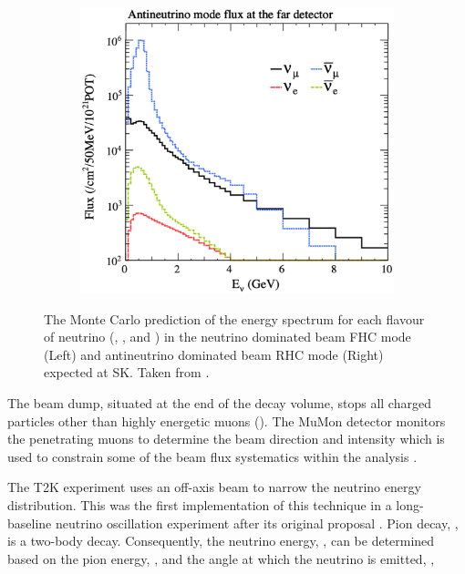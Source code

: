\begin{figure}[h]
\begin{subfigure}[t]{0.45\textwidth}
    \includegraphics[width=\textwidth, trim={0mm 0mm 0mm 0mm}, clip,page=1]{Figures/Detectors/T2KFluxInANuMode.pdf}
  \end{subfigure}
  \caption{The Monte Carlo prediction of the energy spectrum for each flavour of neutrino (, , \quickmath{\nu_\mu} and \quickmath{\bar{\nu}_\mu}) in the neutrino dominated beam FHC mode (Left) and antineutrino dominated beam RHC mode (Right) expected at SK. Taken from \cite{Abe2021-tr}.}
  \label{fig:T2KSKExp_T2K_NuFluxPerMode}
\end{figure}

The beam dump, situated at the end of the decay volume, stops all charged particles other than highly energetic muons (). The MuMon detector monitors the penetrating muons to determine the beam direction and intensity which is used to constrain some of the beam flux systematics within the analysis \cite{MuMon, Vladisavljevic2020-gv}. 

The T2K experiment uses an off-axis beam to narrow the neutrino energy distribution. This was the first implementation of this technique in a long-baseline neutrino oscillation experiment after its original proposal \cite{Beavis1995-qf}. Pion decay, \quickmath{\pi \rightarrow \mu + \nu_\mu}, is a two-body decay. Consequently, the neutrino energy, , can be determined based on the pion energy, , and the angle at which the neutrino is emitted, \quickmath{\theta},

